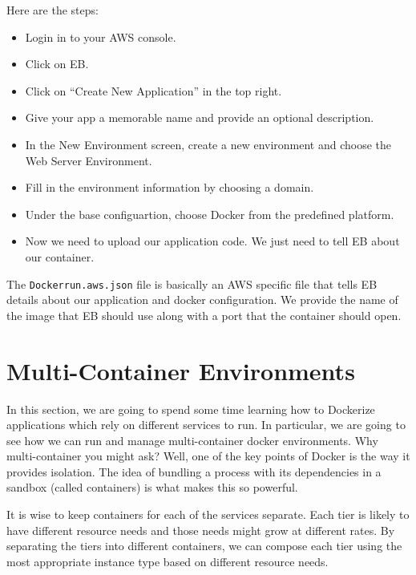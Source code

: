 \documentclass[twoside,twocolumn]{article}
\begin{document}
Here are the steps:
\begin{itemize}
    \item Login in to your AWS console.
    \item Click on EB. 
    \item Click on ``Create New Application'' in the top right.
    \item Give your app a memorable name and provide an optional description.
    \item In the New Environment screen, create a new environment and choose the Web Server Environment.
    \item Fill in the environment information by choosing a domain.
    \item Under the base configuartion, choose Docker from the predefined platform.
    \item Now we need to upload our application code. We just need to tell EB about our container.
\end{itemize}
The \texttt{Dockerrun.aws.json} file is basically an AWS specific file that tells EB details about our application and docker configuration.
We provide the name of the image that EB should use along with a port that the container should open.

\section{Multi-Container Environments}
In this section, we are going to spend some time learning how to Dockerize applications which rely on different services to run.
In particular, we are going to see how we can run and manage multi-container docker environments.
Why multi-container you might ask? Well, one of the key points of Docker is the way it provides isolation. The idea of bundling a process with its dependencies in a sandbox (called containers) is what makes this so powerful.

It is wise to keep containers for each of the services separate.
Each tier is likely to have different resource needs and those needs might grow at different rates.
By separating the tiers into different containers, we can compose each tier using the most appropriate instance type based on different resource needs.
\end{document}
